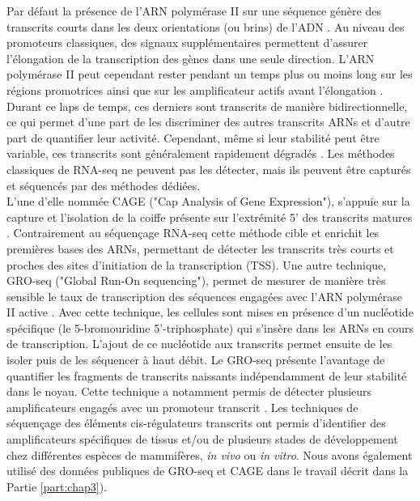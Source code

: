 Par défaut la présence de l'ARN polymérase II sur une séquence génère des transcrits courts dans les deux orientations (ou brins) de l'\acrshort{ADN} \citep{kim_widespread_2010, andersson_atlas_2014}. Au niveau des promoteurs classiques, des signaux supplémentaires permettent d'assurer l'élongation de la transcription des gènes dans une seule direction. L’ARN polymérase II peut cependant rester pendant un temps plus ou moins long sur les régions promotrices ainsi que sur les \gls{amplificateur} actifs avant l’élongation \citep{rougvie_rna_1988, mayer_pause_2017}. Durant ce laps de temps, ces derniers sont transcrits de manière bidirectionnelle, ce qui permet d'une part de les discriminer des autres transcrits \acrshort{ARN}s et d'autre part de quantifier leur activité. Cependant, même si leur stabilité peut être variable, ces transcrits sont généralement rapidement dégradés \citep{almada_promoter_2013}. Les méthodes classiques de \acrshort{RNA-seq} ne peuvent pas les détecter, mais ils peuvent être capturés et séquencés par des méthodes dédiées. \\

L’une d’elle nommée \acrshort{CAGE} ("Cap Analysis of Gene Expression"), s’appuie sur la capture et l’isolation de la coiffe présente sur l’extrémité 5’ des transcrits matures \citep{shiraki_cap_2003, andersson_atlas_2014}. Contrairement au séquençage \acrshort{RNA-seq} cette méthode cible et enrichit les premières bases des \acrshort{ARN}s, permettant de détecter les transcrits très courts et proches des sites d’initiation de la transcription (\acrshort{TSS}). Une autre technique, GRO-seq ("Global Run-On sequencing"), permet de mesurer de manière très sensible le taux de transcription des séquences engagées avec l’ARN polymérase II active \citep{core_nascent_2008}. Avec cette technique, les cellules sont mises en présence d’un nucléotide spécifique (le 5-bromouridine 5'-triphosphate) qui s'insère dans les \acrshort{ARN}s en cours de transcription. L'ajout de ce nucléotide aux transcrits permet ensuite de les isoler puis de les séquencer à haut débit. Le GRO-seq présente l’avantage de quantifier les fragments de transcrits naissants indépendamment de leur stabilité dans le noyau. Cette technique a notamment permis de détecter plusieurs \glspl{amplificateur} engagés avec un promoteur transcrit \citep{melgar_discovery_2011}. Les techniques de séquençage des éléments \gls{cis}-régulateurs transcrits ont permis d’identifier des \glspl{amplificateur} spécifiques de tissus et/ou de plusieurs stades de développement chez différentes espèces de mammifères, \textit{in vivo} ou \textit{in vitro}. Nous avons également utilisé des données publiques de GRO-seq et \acrshort{CAGE} dans le travail décrit dans la Partie \ref{part:chap3}).

